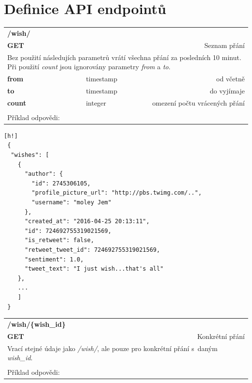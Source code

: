 \documentclass[thesis=B,czech]{FITthesis}[2012/06/26]
\begin{document}
\appendix

\chapter{Definice API endpointů}
\label{appendix-api}
\begin{table}[h]
\begin{tabular}{llllr}
\rowcolor[HTML]{EFEFEF}
\large \textbf{/wish/}        &         &                 &        & \multicolumn{1}{l}{}                \\
\rowcolor[HTML]{EFEFEF}
\textbf{GET}          &         &                 &        & Seznam přání                        \\
\multicolumn{5}{l}{\parbox[t]{12.8cm}{Bez použití následujích parametrů vrátí všechna přání za posledních 10 minut. Při použití \textit{count} jsou ignorovány parametry  \textit{from} a \textit{to}.}  } \\
\textbf{from}         &         & timestamp       &        & od včetně                           \\
\textbf{to}           &         & timestamp       &        & do vyjímaje                         \\
\textbf{count}        &         & integer         &        & omezení počtu vrácených přání      \\
 & & & & \\
 Příklad odpovědi:
\end{tabular}
\end{table}
\begin{lstlisting}[nolol=true][h!]
 {
  "wishes": [
    {
      "author": {
        "id": 2745306105,
        "profile_picture_url": "http://pbs.twimg.com/..",
        "username": "moley Jem"
      },
      "created_at": "2016-04-25 20:13:11",
      "id": 724692755319021569,
      "is_retweet": false,
      "retweet_tweet_id": 724692755319021569,
      "sentiment": 1.0,
      "tweet_text": "I just wish...that's all"
    },
    ...
    ]
 }
\end{lstlisting}


\begin{table}[h]
\begin{tabular}{llllr}
\rowcolor[HTML]{EFEFEF}
\large \textbf{/wish/\{wish\_id\}}        &         &                 &        & \multicolumn{1}{l}{}                \\
\rowcolor[HTML]{EFEFEF}
\textbf{GET}          &         &                 &        & Konkrétní přání                        \\
\multicolumn{5}{l}{\parbox[t]{12.8cm}{Vrací stejné údaje jako \textit{/wish/}, ale pouze pro konkrétní přání s~daným \textit{wish\_id}.}  } \\  
 & & & & \\
 Příklad odpovědi:
\end{tabular}
\end{table}
 
\end{document}
